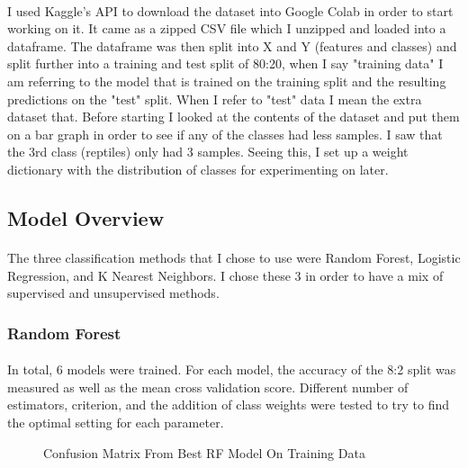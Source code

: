 \documentclass{article}
\begin{document}
\paragraph{}
    I used Kaggle's API to download the dataset into Google Colab in order to start working on it. It came as a zipped CSV file which I unzipped and loaded into a dataframe. The dataframe was then split into X and Y (features and classes) and split further into a training and test split of 80:20, when I say "training data" I am referring to the model that is trained on the training split and the resulting predictions on the "test" split. When I refer to "test" data I mean the extra dataset that. Before starting I looked at the contents of the dataset and put them on a bar graph in order to see if any of the classes had less samples. I saw that the 3rd class (reptiles) only had 3 samples. Seeing this, I set up a weight dictionary with the distribution of classes for experimenting on later.
    
\subsection{Model Overview}
\paragraph{}
    The three classification methods that I chose to use were Random Forest, Logistic Regression, and K Nearest Neighbors. I chose these 3 in order to have a mix of supervised and unsupervised methods.
    
\subsubsection{Random Forest}
\paragraph{}
    In total, 6 models were trained. For each model, the accuracy of the 8:2 split was measured as well as the mean cross validation score. Different number of estimators, criterion, and the addition of class weights were tested to try to find the optimal setting for each parameter.
    
    \begin{figure}[H]
      \centering
      \caption{Confusion Matrix From Best RF Model On Training Data}
    \end{figure}
\end{document}
